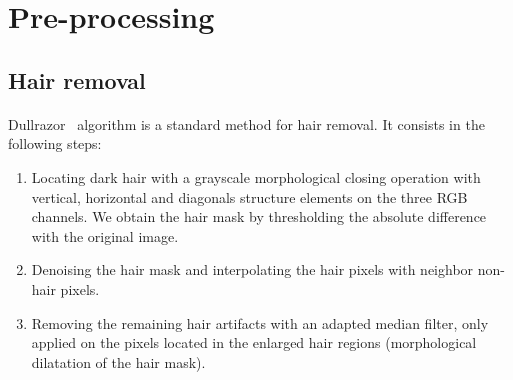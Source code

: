 \documentclass[a4paper,10pt]{article}
\begin{document}
\section{Pre-processing}
\subsection{Hair removal}
\paragraph{} Dullrazor~\cite{Dullrazor1997} algorithm is a standard method for 
hair removal. It consists in the following steps:
\begin{enumerate}
	\item Locating dark hair with a grayscale morphological closing operation with 
	vertical, horizontal and diagonals structure elements on the three RGB channels. 
	We obtain the hair mask by thresholding the absolute difference with the 
	original image. 
	\item Denoising the hair mask and interpolating the hair pixels with neighbor 
	non-hair pixels. 
	\item Removing the remaining hair artifacts with an adapted median filter, only 
	applied on the pixels located in the enlarged hair regions
	(morphological dilatation of the hair mask).
\end{enumerate}
\end{document}
